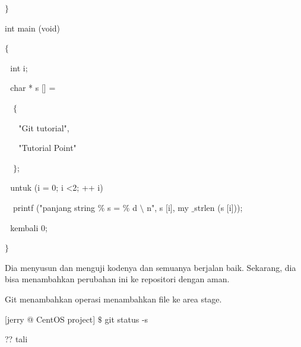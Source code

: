 \noindent 
 \hspace*{0.5in}  $  \}  $ \par
\noindent 
 \hspace*{0.5in} int main (void) \par
\noindent 
 \hspace*{0.5in}  $  \{  $ \par
\noindent 
 \hspace*{0.5in}  $  $ $  $ $  $int i; \par
\noindent 
 \hspace*{0.5in}  $  $ $  $ $  $char * s [] = \par
\noindent 
 \hspace*{0.5in}  $  $ $  $ $  $ $  \{  $ \par
\noindent 
 \hspace*{0.5in}  $  $ $  $ $  $ $  $ $  $ $  $"Git tutorial", \par
\noindent 
 \hspace*{0.5in}  $  $ $  $ $  $ $  $ $  $ $  $"Tutorial Point" \par
\noindent 
 \hspace*{0.5in}  $  $ $  $ $  $ $  \}  $; \par
\noindent 
 \hspace*{0.5in}  $  $ $  $ $  $untuk (i = 0; i <2; ++ i) $  $ $  $ $  $ $  $ $  $ $  $ \par
\noindent 
 $  $ $  $ $  $ \hspace*{0.5in} printf ("panjang string $  \%  $ s = $  \%  $ d  $  \setminus  $ n", s [i], my $  \_  $strlen (s [i])); \par
\noindent 
 \hspace*{0.5in}  $  $ $  $ $  $kembali 0; \par
\noindent 
 \hspace*{0.5in}  $  \}  $ \par
 \vspace{\baselineskip}
\noindent 
Dia menyusun dan menguji kodenya dan semuanya berjalan baik. Sekarang, dia bisa menambahkan perubahan ini ke repositori dengan aman. \par
\vspace{\baselineskip}
\noindent 
Git menambahkan operasi menambahkan file ke area stage. \par
\noindent 
 \hspace*{0.5in} [jerry @ CentOS project]  $  \$  $ git status -s \par
\noindent 
 \hspace*{0.5in} ?? tali \par
